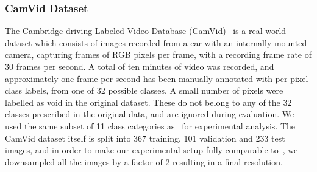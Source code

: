 \documentclass[times,art10,twocolumn,latex8]{article}
\begin{document}
\subsubsection{CamVid Dataset}
The Cambridge-driving Labeled Video Database
(CamVid)~\cite{Brostow2010semantic} is a real-world dataset which consists of
images recorded from a car with an internally mounted camera, capturing frames
of  RGB pixels per frame, with a recording frame rate of 30
frames per second. A total of ten minutes of video was recorded, and
approximately one frame per second has been manually annotated with per pixel
class labels, from one of 32 possible classes.  A small number of pixels were
labelled as void in the original dataset. These do not belong to any of the 32
classes prescribed in the original data, and are ignored during evaluation.  We
used the same subset of 11 class categories as~\cite{badrinarayanan2015segnet}
for experimental analysis.  The CamVid dataset itself is split into 367
training, 101 validation and 233 test images, and in order to make our
experimental setup fully comparable to~\cite{badrinarayanan2015segnet}, we
downsampled all the images by a factor of 2 resulting in a final  resolution.
\end{document}
